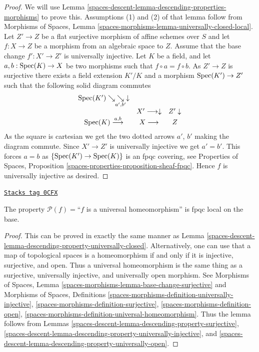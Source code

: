 \begin{proof}
We will use
Lemma \ref{spaces-descent-lemma-descending-properties-morphisms}
to prove this. Assumptions (1) and (2) of that lemma follow from
Morphisms of Spaces,
Lemma \ref{spaces-morphisms-lemma-universally-closed-local}.
Let $Z' \to Z$ be a flat surjective morphism of affine schemes
over $S$ and let $f : X \to Z$ be a morphism from an algebraic space to $Z$.
Assume that the base change $f' : X' \to Z'$ is universally injective.
Let $K$ be a field, and let $a, b : \operatorname{Spec}(K) \to X$
be two morphisms such that $f \circ a = f \circ b$.
As $Z' \to Z$ is surjective there exists a field
extension $K'/K$ and a morphism
$\operatorname{Spec}(K') \to Z'$
such that the following solid diagram commutes
$$
\begin{array}{ccc}\operatorname{Spec}(K') \searrow\underset{a', b'}{\searrow}\downarrow &  &  \\  & X' \longrightarrow\downarrow & Z' \downarrow \\ \operatorname{Spec}(K) \overset{a, b}{\longrightarrow} & X \longrightarrow & Z\end{array}
$$
As the square is cartesian we get the two dotted arrows $a'$, $b'$ making the
diagram commute. Since $X' \to Z'$ is universally injective we get $a' = b'$.
This forces $a = b$ as $\{\operatorname{Spec}(K') \to \operatorname{Spec}(K)\}$
is an fpqc covering, see
Properties of Spaces, Proposition
\ref{spaces-properties-proposition-sheaf-fpqc}.
Hence $f$ is universally injective as desired.
\end{proof}

\begin{lemma}
\label{spaces-descent-lemma-descending-property-universal-homeomorphism}
\href{https://stacks.math.columbia.edu/tag/0CFX}{\texttt{Stacks tag 0CFX}}

The property $\mathcal{P}(f) =$``$f$ is a universal homeomorphism''
is fpqc local on the base.
\end{lemma}

\begin{proof}
This can be proved in exactly the same manner as
Lemma \ref{spaces-descent-lemma-descending-property-universally-closed}.
Alternatively, one can use that a map of topological spaces is a
homeomorphism if and only if it is injective, surjective, and open.
Thus a universal homeomorphism is the same thing as a
surjective, universally injective, and universally open morphism.
See Morphisms of Spaces, Lemma
\ref{spaces-morphisms-lemma-base-change-surjective} and
Morphisms of Spaces, Definitions
\ref{spaces-morphisms-definition-universally-injective},
\ref{spaces-morphisms-definition-surjective},
\ref{spaces-morphisms-definition-open},
\ref{spaces-morphisms-definition-universal-homeomorphism}.
Thus the lemma follows from
Lemmas \ref{spaces-descent-lemma-descending-property-surjective},
\ref{spaces-descent-lemma-descending-property-universally-injective}, and
\ref{spaces-descent-lemma-descending-property-universally-open}.
\end{proof}

